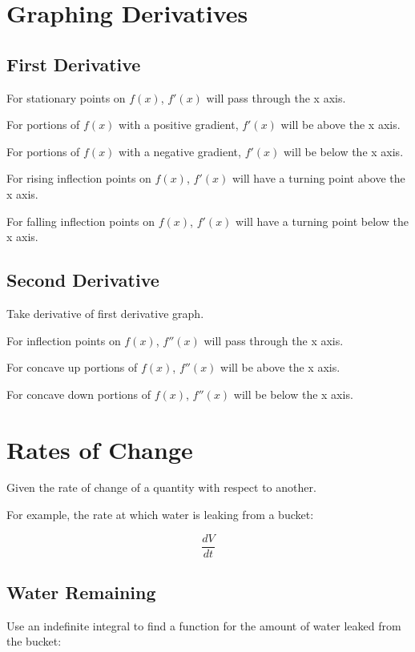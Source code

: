 \documentclass[a4paper,11pt]{article}
\begin{document}
\section{Graphing Derivatives}

\subsection{First Derivative}

For stationary points on $f(x)$, $f'(x)$ will pass through the x axis.

For portions of $f(x)$ with a positive gradient, $f'(x)$ will be above the x
axis.

For portions of $f(x)$ with a negative gradient, $f'(x)$ will be below the x
axis.

For rising inflection points on $f(x)$, $f'(x)$ will have a turning point above
the x axis.

For falling inflection points on $f(x)$, $f'(x)$ will have a turning point
below the x axis.


\subsection{Second Derivative}

Take derivative of first derivative graph.

For inflection points on $f(x)$, $f''(x)$ will pass through the x axis.

For concave up portions of $f(x)$, $f''(x)$ will be above the x axis.

For concave down portions of $f(x)$, $f''(x)$ will be below the x axis.




\section{Rates of Change}

Given the rate of change of a quantity with respect to another.

For example, the rate at which water is leaking from a bucket:

$$
\frac{dV}{dt}
$$


\subsection{Water Remaining}

Use an indefinite integral to find a function for the amount of water leaked
from the bucket:
\end{document}
